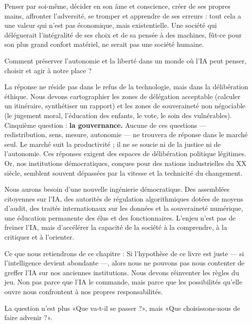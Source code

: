 Penser par soi-même, décider en son âme et conscience, créer de ses propres mains, affronter l'adversité, se tromper et apprendre de ses erreurs : tout cela a une valeur qui n'est pas économique, mais existentielle. Une société qui déléguerait l'intégralité de ses choix et de sa pensée à des machines, fût-ce pour son plus grand confort matériel, ne serait pas une société humaine.

\begin{aiquote}
Comment préserver l'autonomie et la liberté dans un monde où l'IA peut penser, choisir et agir à notre place ?
\end{aiquote}

La réponse ne réside pas dans le refus de la technologie, mais dans la délibération éthique. Nous devons cartographier les zones de délégation acceptable (calculer un itinéraire, synthétiser un rapport) et les zones de souveraineté non négociable (le jugement moral, l'éducation des enfants, le vote, le soin des vulnérables). Cinquième question : \textbf{la gouvernance.} Aucune de ces questions — redistribution, sens, mesure, autonomie — ne trouvera de réponse dans le marché seul. Le marché suit la productivité ; il ne se soucie ni de la justice ni de l'autonomie. Ces réponses exigent des espaces de délibération politique légitimes. Or, nos institutions démocratiques, conçues pour des nations industrielles du XX siècle, semblent souvent dépassées par la vitesse et la technicité du changement.

Nous aurons besoin d'une nouvelle ingénierie démocratique. Des assemblées citoyennes sur l'IA, des autorités de régulation algorithmiques dotées de moyens d'audit, des traités internationaux sur les données et la souveraineté numérique, une éducation permanente des élus et des fonctionnaires. L'enjeu n'est pas de freiner l'IA, mais d'accélérer la capacité de la société à la comprendre, à la critiquer et à l'orienter.

Ce que nous retiendrons de ce chapitre : Si l'hypothèse de ce livre est juste — si l'intelligence devient abondante —, alors nous ne pouvons pas nous contenter de greffer l'IA sur nos anciennes institutions. Nous devons réinventer les règles du jeu. Non pas parce que l'IA le commande, mais parce que les possibilités qu'elle ouvre nous confrontent à nos propres responsabilités.

La question n'est plus «Que va-t-il se passer ?», mais «Que choisissons-nous de faire advenir ?».
